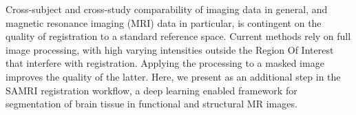 Cross-subject and cross-study comparability of imaging data in general, and magnetic resonance imaging (MRI) data in particular, is contingent on the quality of registration to a standard reference space.
Current methods rely on full image processing, with high varying intensities outside the Region Of Interest that interfere with registration.
Applying the processing to a masked image improves the quality of the latter.
Here, we present as an additional step in the SAMRI registration workflow, a deep learning enabled framework for segmentation of brain tissue in functional and structural MR images.



